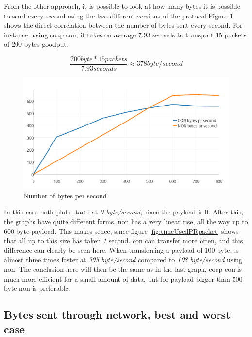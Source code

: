 From the other approach, it is possible to look at how many bytes it is possible to send every second using the two different versions of the protocol.Figure \ref{fig:bytesPRSecond2}  shows the direct correlation between the number of bytes sent every second. For instance: using \gls{coap} \gls{con}, it takes on average 7.93 seconds to transport 15 packets of 200 bytes goodput. 

\begin{equation} \label{CONexampleFig411}
	\frac{200 byte * 15 packets}{7.93 seconds} \approx 378 byte/second
\end{equation}


\begin{figure}[ht]
    \centering
    \includegraphics[scale=1.0]{bytesPRSecond2.png}    
    \caption{Number of bytes per second}
    \label{fig:bytesPRSecond2}
\end{figure}



In this case both plots starts at \textit{0 byte/second}, since the payload is 0. After this, the graphs have quite different forms. \gls{non} has a very linear rise, all the way up to 600 byte payload. This makes sence, since figure \ref{fig:timeUsedPRpacket} shows that all up to this size has taken \textit{1} second. \gls{con} can transfer more often, and this difference can clearly be seen here. When transferring a payload of 100 byte, is almost three times faster at \textit{305 byte/second} compared to \textit{108 byte/second} using \gls{non}. The conclusion here will then be the same as in the last graph, \gls{coap} \gls{con} is much more efficient for a small amount of data, but for payload bigger than 500 byte \gls{non} is preferable. 


\subsection{Bytes sent through network, best and worst case}

